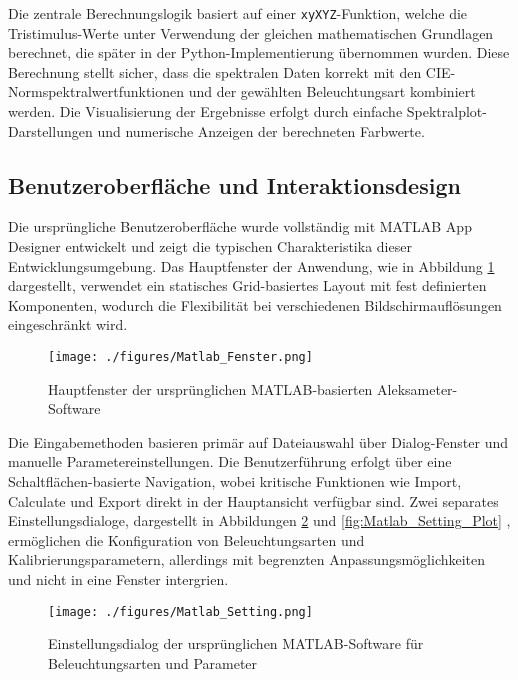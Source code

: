 Die zentrale Berechnungslogik basiert auf einer \lstinline{xyXYZ}-Funktion, welche die Tristimulus-Werte unter Verwendung der gleichen mathematischen Grundlagen berechnet, die später in der Python-Implementierung übernommen wurden. Diese Berechnung stellt sicher, dass die spektralen Daten korrekt mit den CIE-Normspektralwertfunktionen und der gewählten Beleuchtungsart kombiniert werden. Die Visualisierung der Ergebnisse erfolgt durch einfache Spektralplot-Darstellungen und numerische Anzeigen der berechneten Farbwerte.

\subsection{Benutzeroberfläche und Interaktionsdesign}

Die ursprüngliche Benutzeroberfläche wurde vollständig mit MATLAB App Designer entwickelt und zeigt die typischen Charakteristika dieser Entwicklungsumgebung. Das Hauptfenster der Anwendung, wie in Abbildung \ref{fig:matlab_hauptfenster} dargestellt, verwendet ein statisches Grid-basiertes Layout mit fest definierten Komponenten, wodurch die Flexibilität bei verschiedenen Bildschirmauflösungen eingeschränkt wird.

\begin{figure}[hbpt]
    	\centering
    	\texttt{[image: ./figures/Matlab\_Fenster.png]}
    	\caption{Hauptfenster der ursprünglichen MATLAB-basierten Aleksameter-Software}
    	\label{fig:matlab_hauptfenster}
    \end{figure}
    
Die Eingabemethoden basieren primär auf Dateiauswahl über Dialog-Fenster und manuelle Parametereinstellungen. Die Benutzerführung erfolgt über eine Schaltflächen-basierte Navigation, wobei kritische Funktionen wie Import, Calculate und Export direkt in der Hauptansicht verfügbar sind. Zwei separates Einstellungsdialoge, dargestellt in Abbildungen \ref{fig:matlab_settings} und \ref{fig:Matlab_Setting_Plot} , ermöglichen die Konfiguration von Beleuchtungsarten und Kalibrierungsparametern, allerdings mit begrenzten Anpassungsmöglichkeiten und nicht in eine Fenster intergrien.

\begin{figure}[hbpt]
    	\centering
    	\texttt{[image: ./figures/Matlab\_Setting.png]}
    	\caption{Einstellungsdialog der ursprünglichen MATLAB-Software für Beleuchtungsarten und Parameter}
    	\label{fig:matlab_settings}
    \end{figure}

